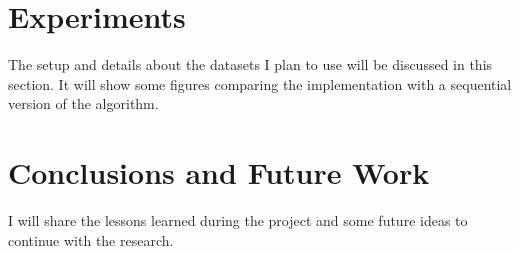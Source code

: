 \documentclass[12pt]{scrartcl}
\begin{document}
\section{Experiments}
The setup and details about the datasets I plan to use will be discussed in this section.  It will show some figures comparing the implementation with a sequential version of the algorithm.

\section{Conclusions and Future Work}
I will share the lessons learned during the project and some future ideas to continue with the research.



\end{document}
